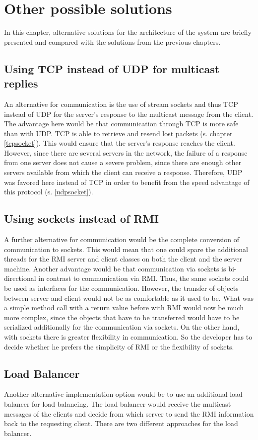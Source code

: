 \chapter{Other possible solutions}
\label{other-solutions}
In this chapter, alternative solutions for the architecture of the system are briefly presented and compared with the solutions from the previous chapters.
\section{Using TCP instead of UDP for multicast replies}
An alternative for communication is the use of stream sockets and thus TCP instead of UDP for the server's response to the multicast message from the client. The advantage here would be that communication through TCP is more safe than with UDP. TCP is able to retrieve and resend lost packets (s. chapter \ref{tcpsocket}). This would ensure that the server's response reaches the client. However, since there are several servers in the network, the failure of a response from one server does not cause a severe problem, since there are enough other servers available from which the client can receive a response. Therefore, UDP was favored here instead of TCP in order to benefit from the speed advantage of this protocol (s. \ref{udpsocket}).
\section{Using sockets instead of RMI}
A further alternative for communication would be the complete conversion of communication to sockets. This would mean that one could spare the additional threads for the RMI server and client classes on both the client and the server machine. Another advantage would be that communication via sockets is bi-directional in contrast to communication via RMI. Thus, the same sockets could be used as interfaces for the communication. However, the transfer of objects between server and client would not be as comfortable as it used to be. What was a simple method call with a return value before with RMI would now be much more complex, since the objects that have to be transferred would have to be serialized additionally for the communication via sockets. On the other hand, with sockets there is greater flexibility in communication. So the developer has to decide whether he prefers the simplicity of RMI or the flexibility of sockets.
\section{Load Balancer}
Another alternative implementation option would be to use an additional load balancer for load balancing. The load balancer would receive the multicast messages of the clients and decide from which server to send the RMI information back to the requesting client. There are two different approaches for the load balancer.
